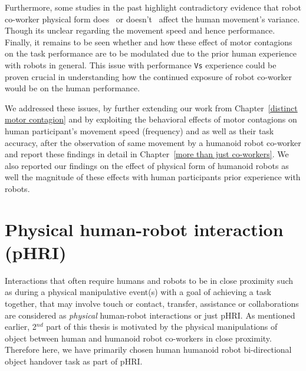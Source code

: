 Furthermore, some studies in the past highlight contradictory evidence that robot co-worker physical form does~\cite{Chaminade:JPP:2009} or doesn't~\cite{Kupferberg:PlosOne:2012} affect the human movement's variance. Though its unclear regarding the movement speed and hence performance. Finally, it remains to be seen whether and how these effect of motor contagions on the task performance are to be modulated due to the prior human experience with robots in general. This issue with performance \texttt{Vs} experience could be proven crucial in understanding how the continued exposure of robot co-worker would be on the human performance.

We addressed these issues, by further extending our work from Chapter~\ref{distinct motor contagion} and by exploiting the behavioral effects of motor contagions on human participant's movement speed (frequency) and as well as their task accuracy, after the observation of same movement by a humanoid robot co-worker and report these findings in detail in Chapter~\ref{more than just co-workers}. We also reported our findings on the effect of physical form of humanoid robots as well the magnitude of these effects with human participants prior experience with robots.




\section{Physical human-robot interaction (pHRI)}


Interactions that often require humans and robots to be in close proximity such as during a physical manipulative event(s) with a goal of achieving a task together, that may involve touch or contact, transfer, assistance or collaborations are considered as \textit{physical} human-robot interactions or just pHRI. As mentioned earlier, 2$^{nd}$ part of this thesis is motivated by the physical manipulations of object between human and humanoid robot co-workers in close proximity. Therefore here, we have primarily chosen human humanoid robot bi-directional object handover task as part of pHRI.  

